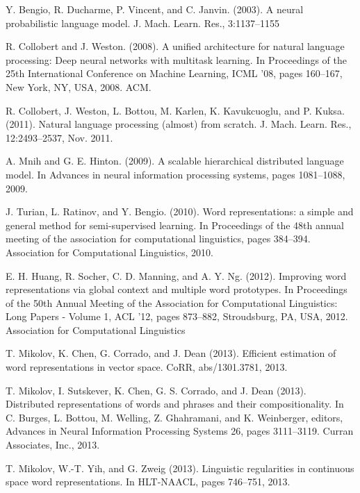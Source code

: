 \documentclass[twoside]{article}
\begin{document}
\begin{thebibliography}{99}
Y. Bengio, R. Ducharme, P. Vincent, and C. Janvin. (2003). 
\newblock  A neural probabilistic language model.
\newblock  J. Mach. Learn. Res., 3:1137–1155

R. Collobert and J. Weston. (2008). 
\newblock  A unified architecture for natural language processing: Deep neural networks with multitask learning.
\newblock  In Proceedings of the 25th International Conference on Machine Learning, ICML ’08, pages 160–167, New York, NY, USA, 2008. ACM.

R. Collobert, J. Weston, L. Bottou, M. Karlen, K. Kavukcuoglu, and P. Kuksa. (2011). 
\newblock  Natural language processing (almost) from scratch.
\newblock  J. Mach. Learn. Res., 12:2493–2537, Nov. 2011.

A. Mnih and G. E. Hinton. (2009). 
\newblock  A scalable hierarchical distributed language model.
\newblock  In Advances in neural information processing systems, pages 1081–1088, 2009.

 J. Turian, L. Ratinov, and Y. Bengio. (2010). 
\newblock  Word representations: a simple and general method for semi-supervised learning.
\newblock In Proceedings of the 48th annual meeting of the association for computational linguistics, pages 384–394. Association for Computational Linguistics, 2010.

 E. H. Huang, R. Socher, C. D. Manning, and A. Y. Ng. (2012). 
\newblock  Improving word representations via global context and multiple word prototypes.
\newblock In Proceedings of the 50th Annual Meeting of the Association for Computational Linguistics: Long Papers - Volume 1, ACL ’12, pages 873–882, Stroudsburg, PA, USA, 2012. Association for Computational Linguistics

  T. Mikolov, K. Chen, G. Corrado, and J. Dean (2013). 
\newblock Efficient estimation of word representations in vector space.
\newblock CoRR, abs/1301.3781, 2013.

 T. Mikolov, I. Sutskever, K. Chen, G. S. Corrado, and J. Dean (2013). 
\newblock Distributed representations of words and phrases and their compositionality.
\newblock In C. Burges, L. Bottou, M. Welling, Z. Ghahramani, and K. Weinberger, editors, Advances in Neural Information Processing Systems 26, pages 3111–3119. Curran Associates, Inc., 2013.

 T. Mikolov, W.-T. Yih, and G. Zweig (2013). 
\newblock Linguistic regularities in continuous space word representations.
\newblock In HLT-NAACL, pages 746–751, 2013.


\end{thebibliography}
\end{document}
